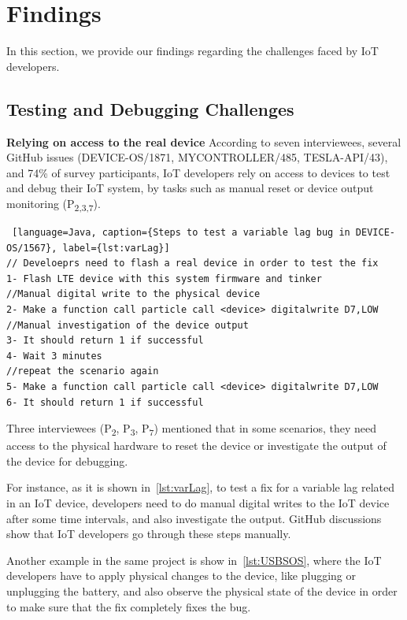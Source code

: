 {\section{Findings}
In this section, we provide our findings regarding the challenges faced by IoT developers.

\subsection{Testing and Debugging Challenges}
\textbf{Relying on access to the real device}
According to seven interviewees, several GitHub issues (DEVICE-OS/1871, MYCONTROLLER/485, TESLA-API/43), and 74\% of survey participants, IoT developers rely on access to devices to test and debug their IoT system, by tasks such as manual reset or device output monitoring (P\textsubscript{2,3,7}).

\begin{lstlisting} [language=Java, caption={Steps to test a variable lag bug in DEVICE-OS/1567}, label={lst:varLag}] 
// Develoeprs need to flash a real device in order to test the fix
1- Flash LTE device with this system firmware and tinker
//Manual digital write to the physical device
2- Make a function call particle call <device> digitalwrite D7,LOW 
//Manual investigation of the device output
3- It should return 1 if successful   
4- Wait 3 minutes 
//repeat the scenario again
5- Make a function call particle call <device> digitalwrite D7,LOW
6- It should return 1 if successful 
\end{lstlisting}



Three interviewees (P\textsubscript{2}, P\textsubscript{3}, P\textsubscript{7}) mentioned that in some scenarios, they need access to the physical hardware to reset the device or investigate the output of the device for debugging.

 For instance, as it is shown in~\autoref{lst:varLag}, to test a fix for a variable lag related in an IoT device, developers need to do manual digital writes to the IoT device after some time intervals, and also investigate the output. GitHub discussions show that IoT developers go through these steps manually.
 
 Another example in the same project is show in~\autoref{lst:USBSOS}, where the IoT developers have to apply physical changes to the device, like plugging or unplugging the battery, and also observe the physical state of the device in order to make sure that the fix completely fixes the bug. 


}
